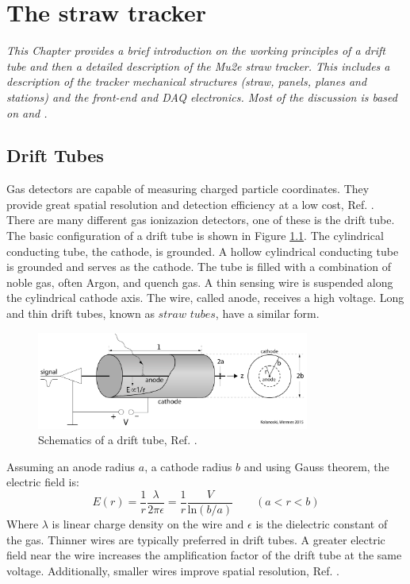 \chapter{The straw tracker}\label{chaptertrk}

\textit{This Chapter provides a brief introduction on the working principles 
of a drift tube and then a  detailed description of the Mu2e straw tracker. 
This includes a description of the tracker mechanical structures 
(straw, panels, planes and stations) and the front-end and DAQ electronics. 
Most of the discussion is based on \cite{kola} and \cite{bobbb}.}

\section{Drift Tubes}
Gas detectors are capable of measuring charged particle coordinates. 
They provide great spatial resolution and detection efficiency at a low cost, Ref. \cite{kola}. 
There are many different gas ionizazion detectors, one of these is the drift tube.
The basic configuration of a drift tube is shown in Figure \ref{fig:drifttube}.
The cylindrical conducting tube, the cathode, is grounded.
A hollow cylindrical conducting tube is grounded and serves as the cathode.
The tube is filled with a combination of noble gas, often Argon, and quench gas. 
A thin sensing wire is suspended along the cylindrical cathode axis. 
The wire, called anode, receives a high voltage. Long and thin drift tubes, known as $straw$ $tubes$, have a similar form.
\begin{figure}[!h]
    \centering
    \includegraphics[width =0.8\textwidth]{figures/png/Screenshot_20240324_232621.png}
    \caption{Schematics of a drift tube, Ref. \cite{kola}.}
    \label{fig:drifttube}
    \end{figure}
Assuming an anode radius $a$, a cathode radius $b$ and using Gauss theorem, the electric field is:
\begin{equation}\label{avalanche}
    E(r)=\frac{1}{r}\frac{\lambda}{2\pi \epsilon}=\frac{1}{r}\frac{V}{ \text{ln}(b/a)} \qquad (a<r<b)
\end{equation}
Where $\lambda$ is linear charge density on the wire and $\epsilon$ is the dielectric constant of the gas.
Thinner wires are typically preferred in drift tubes. A greater electric field near the wire increases the amplification factor 
of the drift tube at the same voltage. Additionally, smaller wires improve spatial resolution, Ref. \cite{kola}. 

